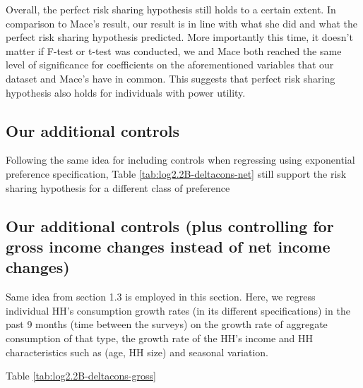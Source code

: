 \documentclass[12pt,a4paper]{article}
\begin{document}
Overall, the perfect risk sharing hypothesis still holds to a certain extent. In comparison to Mace's result, our result is in line with what she did and what the perfect risk sharing hypothesis predicted. More importantly this time, it doesn't matter if F-test or t-test was conducted, we and Mace both reached the same level of significance for coefficients on the aforementioned variables that our dataset and Mace's have in common. This suggests that perfect risk sharing hypothesis also holds for individuals with power utility.


\subsection*{Our additional controls}

Following the same idea for including controls when regressing using exponential preference specification,  Table \ref{tab:log2.2B-deltacons-net} still support the risk sharing hypothesis for a different class of preference


\subsection*{Our additional controls (plus controlling for gross income changes instead of net income changes)}

Same idea from section 1.3 is employed in this section. Here, we regress individual HH's consumption growth rates (in its different specifications) in the past 9 months (time between the surveys) on the growth rate of aggregate consumption of that type, the growth rate of the HH's income and HH characteristics such as (age, HH size) and seasonal variation.

Table \ref{tab:log2.2B-deltacons-gross}


\clearpage
{}


\end{document}
